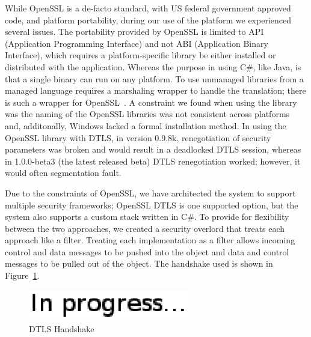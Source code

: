 \documentclass[conference]{IEEEtran}
\begin{document}
While OpenSSL is a de-facto standard, with US federal government approved code, and 
platform portability, during our use of the platform we experienced several
issues.  The portability provided by OpenSSL is limited to API (Application
Programming Interface) and not ABI (Application Binary Interface), which
requires a platform-specific library be either installed or distributed with
the application.  Whereas the purpose in using C\#, like Java, is that a single
binary can run on any platform.  To use unmanaged libraries from a managed
language requires a marshaling wrapper to handle the translation; there is
such a wrapper for OpenSSL~\cite{openssl.net}.  A constraint we found when
using the library was the naming of the OpenSSL libraries was not consistent
across platforms and, additonally, Windows lacked a formal installation method.
In using the OpenSSL library with DTLS, in version 0.9.8k, renegotiation of
security parameters  was broken and would result in a deadlocked DTLS session,
whereas in 1.0.0-beta3 (the latest released beta) DTLS renegotiation worked;
however, it would often segmentation fault.

Due to the constraints of OpenSSL, we have architected the system to support multiple security 
frameworks; OpenSSL DTLS is one supported option, but the system also supports a custom stack written in C\#.
To provide for flexibility between
the two approaches, we created a security overlord that treats each approach
like a filter.  Treating each implementation as a filter allows incoming control
and data messages to be pushed into the object and data and control messages to
be pulled out of the object.  The handshake used is shown in
Figure~\ref{fig:dtls}.

\begin{figure}[h]
\centering
\includegraphics[width=2.75in]{in_progress.eps}
\caption{DTLS Handshake}
\label{fig:dtls}
\end{figure}
\end{document}
